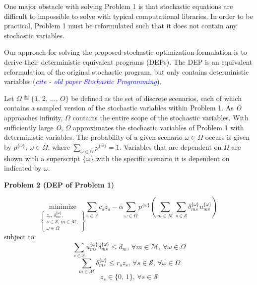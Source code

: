 \documentclass[12pt,onecolumn]{IEEEtran}
\begin{document}

One major obstacle with solving Problem 1 is that stochastic equations are difficult to impossible to solve with typical computational libraries.  In order to be practical, Problem 1 must be reformulated such that it does not contain any stochastic variables.

Our approach for solving the proposed stochastic optimization formulation is to derive their deterministic equivalent programs (DEPs).  The DEP is an equivalent reformulation of the original stochastic program, but only contains deterministic variables (\textit{\textcolor{blue}{cite - old paper Stochastic Programming}}).

Let $ \Omega \eqdef \{1,\, 2,\, \ldots,\, O\} $ be defined as the set of discrete scenarios, each of which contains a sampled version of the stochastic variables within Problem 1.  As \textit{O} approaches infinity, $\Omega$ contains the entire scope of the stochastic variables.  With sufficiently large \textit{O}, $\Omega$ approximates the stochastic variables of Problem 1 with deterministic variables.  The probability of a given scenario $\omega \in \Omega$ occurs is given by $p^{\{\omega\}},\, \omega \in \Omega$, where $\sum_{\omega \in \Omega} p^{\{\omega\}} = 1$.  Variables that are dependent on $\Omega$ are shown with a superscript \{$\omega$\} with the specific scenario it is dependent on indicated by $\omega$.

\vspace{5mm}
\noindent \textbf{Problem 2 (DEP of Problem 1)}



\begin{equation} \label{eq:P2}
\underset{\left\{ \substack{
	z_s,\, \delta_{ms}^{\{\omega\}},\\
	s \in \mathcal{S},\, m \in \mathcal{M},\\
	\omega \in \Omega} \right\}} {\text{minimize}}
\sum_{s \in \mathcal{S}} c_s z_s - \alpha \sum_{\omega \in \Omega} p^{\{\omega\}} \left( \sum_{m \in \mathcal{M}} \sum_{s \in \mathcal{S}} \delta_{ms}^{\{\omega\}} u_{ms}^{\{\omega\}} \right)
\end{equation}
subject to:
\begin{equation} \label{eq:P2C1}
\sum_{s \in \mathcal{S}} u_{ms}^{\{\omega\}} \delta_{ms}^{\{\omega\}} \leq d_m,\, \forall m \in \mathcal{M},\, \forall \omega \in \Omega
\end{equation}
\begin{equation} \label{eq:P2C2}
\sum_{m \in \mathcal{M}} \delta_{ms}^{\{\omega\}} \leq r_s z_s,\, \forall s \in \mathcal{S},\, \forall \omega \in \Omega
\end{equation}
\begin{equation} \label{eq:P2C3}
z_s \in \{0,\, 1\},\, \forall s \in \mathcal{S}
\end{equation}
\end{document}
